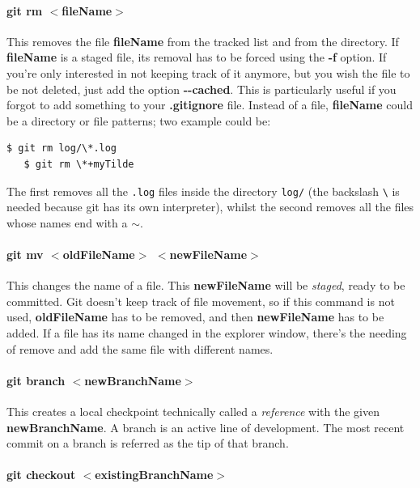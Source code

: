 \documentclass[a4paper, 12pt]{article}
\begin{document}
\paragraph{git rm $<$fileName$>$} This removes the file \textbf{fileName} from the tracked list and from the directory. If \textbf{fileName} is a staged file, its removal has to be forced using the \textbf{-f} option. If you're only interested in not keeping track of it anymore, but you wish the file to be not deleted, just add the option \textbf{-{}-cached}. This is particularly useful if you forgot to add something to your \textbf{.gitignore} file. Instead of a file, \textbf{fileName} could be a directory or file patterns; two example could be:
\begin{Verbatim}[commandchars=+\[\]]
   $ git rm log/\*.log
   $ git rm \*+myTilde
\end{Verbatim}
The first removes all the \verb|.log| files inside the directory \verb|log/| (the backslash \verb|\| is needed because git has its own interpreter), whilst the second removes all the files whose names end with a $\sim$.

\paragraph{git mv $<$oldFileName$>$ $<$newFileName$>$} This changes the name of a file. This \textbf{newFileName} will be \emph{staged}, ready to be committed. Git doesn't keep track of file movement, so if this command is not used, \textbf{oldFileName} has to be removed, and then \textbf{newFileName} has to be added. If a file has its name changed in the explorer window, there's the needing of remove and add the same file with different names.






\paragraph{git branch $<$newBranchName$>$}
This creates a local checkpoint technically called a \emph{reference} with the given \textbf{newBranchName}. A branch is an active line of development. The most recent commit on a branch is referred as the tip of that branch.

\paragraph{git checkout $<$existingBranchName$>$}
\end{document}
